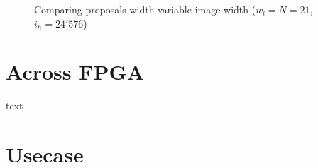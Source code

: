 \begin{figure}[tb!]
    \centering
    \begin{adjustbox}{max width=\linewidth}
        
    \end{adjustbox}
    \caption{Comparing proposals width variable image width ($w_l=N=21$,
    $i_h=24'576$)}
    \label{fig:sca:compfixheight}
\end{figure}


\section{Across FPGA}
text

\section{Usecase}

